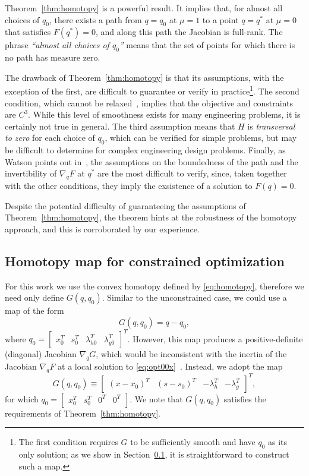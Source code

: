 Theorem~\ref{thm:homotopy} is a powerful result.  It implies that, for almost
all choices of $q_0$, there exists a path from $q=q_0$ at $\mu=1$ to a point
$q=q^*$ at $\mu=0$ that satisfies $F(q^*) = 0$, and along this path the Jacobian
is full-rank.  The phrase \emph{``almost all choices of $q_0$''} means that the
set of points for which there is no path has measure zero.

The drawback of Theorem~\ref{thm:homotopy} is that its assumptions, with the
exception of the first, are difficult to guarantee or verify in
practice\footnote{The first condition requires $G$ to be sufficiently smooth and
  have $q_0$ as its only solution; as we show in Section~\ref{sec:map}, it is
  straightforward to construct such a map.}.  The second condition, which cannot
be relaxed~\cite{watson_2002}, implies that the objective and constraints are
$C^3$.  While this level of smoothness exists for many engineering problems, it
is certainly not true in general.  The third assumption means that $H$ is
\emph{transversal to zero} for each choice of $q_0$, which can be verified for
simple problems, but may be difficult to determine for complex engineering
design problems.  Finally, as Watson points out in~\cite{watson_2002}, the
assumptions on the boundedness of the path and the invertibility of $\nabla_q F$
at $q^{*}$ are the most difficult to verify, since, taken together with the
other conditions, they imply the exsistence of a solution to $F(q) = 0$.

Despite the potential difficulty of guaranteeing the assumptions of
Theorem~\ref{thm:homotopy}, the theorem hints at the robustness of the homotopy
approach, and this is corroborated by our experience.

\subsection{Homotopy map for constrained optimization}\label{sec:map}

For this work we use the convex homotopy defined by \eqref{eq:homotopy},
therefore we need only define $G(q,q_0)$.  Similar to the unconstrained case, we
could use a map of the form
\begin{equation*}
  G(q,q_0) = q - q_0,
\end{equation*}
where $q_0 = \begin{bmatrix} x_0^T & s_0^T & \lambda_{h0}^T &  \lambda_{g0}^T \end{bmatrix}^T$.  However, this map produces a
positive-definite (diagonal) Jacobian $\nabla_q G$, which would be inconsistent
with the inertia of the Jacobian $\nabla_q F$ at a local solution to
\eqref{eq:opt00x}~\cite{Nocedal2006NO}.  Instead, we adopt the map
\begin{equation*}
  G(q,q_0) \equiv \begin{bmatrix}
    (x - x_0)^T &
    (s - s_0)^T &
    -\lambda_h^T & 
    -\lambda_g^T
  \end{bmatrix}^T, 
\end{equation*}
for which $q_0 = \begin{bmatrix} x_0^T & s_0^T & 0^T & 0^T \end{bmatrix}$.
We note that $G(q,q_0)$ satisfies the requirements of
Theorem~\ref{thm:homotopy}. 

